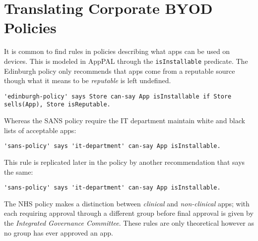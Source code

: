 \documentclass{easychair}
\begin{document}

\section{Translating Corporate BYOD Policies}
\label{sec:translation}

It is common to find rules in policies describing what apps can be used on devices.
This is modeled in AppPAL through the \texttt{isInstallable} predicate.
The Edinburgh policy only recommends that apps come from a reputable source though what it means to be \emph{reputable} is left undefined. 
\begin{lstlisting}[title={\footnotesize\textbf{Edinburgh}:~\itshape ``Only download applications (‘apps’) or other software from reputable sources.''}]
'edinburgh-policy' says Store can-say App isInstallable if Store sells(App), Store isReputable.
\end{lstlisting}
Whereas the SANS policy require the IT department maintain white and black lists of acceptable apps:
\begin{lstlisting}[title={\footnotesize\textbf{SANS}:~\itshape ``The IT Department maintains a list of allowed and unauthorzed applications and makes them available to users on the intranet.''}]
'sans-policy' says 'it-department' can-say App isInstallable.
\end{lstlisting}
This rule is replicated later in the policy by another recommendation that says the same:
\begin{lstlisting}[title={\footnotesize\textbf{SANS}:~\itshape ``Only approved third party applications can be
installed on handhelds. The approved list can be
obtained by contacting the IT department, or should be
available on the intranet.''}]
'sans-policy' says 'it-department' can-say App isInstallable.
\end{lstlisting}
The NHS policy makes a distinction between \emph{clinical} and \emph{non-clinical} apps;
    with each requiring approval through a different group before final approval is given by the \emph{Integrated Governance Committee}.
These rules are only theoretical however as no group has ever approved an app.
\end{document}
